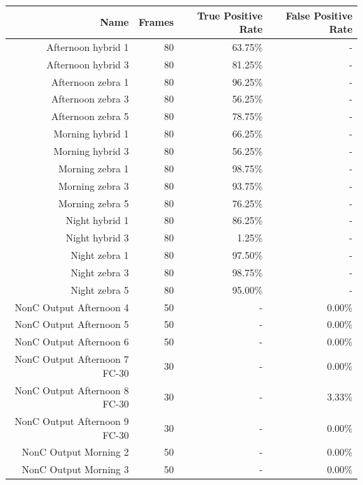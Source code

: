\documentclass[12pt]{ucthesis}
\begin{document}
    \begin{longtable}{|r|r|r|r|}
    \hline
    Name & Frames & True Positive Rate & False Positive Rate \bigstrut\\
    \hline
    Afternoon hybrid 1 & 80 & 63.75\% & - \bigstrut\\
    \hline
    Afternoon hybrid 3 & 80 & 81.25\% & - \bigstrut\\
    \hline
    Afternoon zebra 1 & 80 & 96.25\% & - \bigstrut\\
    \hline
    Afternoon zebra 3 & 80 & 56.25\% & - \bigstrut\\
    \hline
    Afternoon zebra 5 & 80 & 78.75\% & - \bigstrut\\
    \hline
    Morning hybrid 1 & 80 & 66.25\% & - \bigstrut\\
    \hline
    Morning hybrid 3 & 80 & 56.25\% & - \bigstrut\\
    \hline
    Morning zebra 1 & 80 & 98.75\% & - \bigstrut\\
    \hline
    Morning zebra 3 & 80 & 93.75\% & - \bigstrut\\
    \hline
    Morning zebra 5 & 80 & 76.25\% & - \bigstrut\\
    \hline
    Night hybrid 1 & 80 & 86.25\% & - \bigstrut\\
    \hline
    Night hybrid 3 & 80 & 1.25\% & - \bigstrut\\
    \hline
    Night zebra 1 & 80 & 97.50\% & - \bigstrut\\
    \hline
    Night zebra 3 & 80 & 98.75\% & - \bigstrut\\
    \hline
    Night zebra 5 & 80 & 95.00\% & - \bigstrut\\
    \hline
    NonC Output Afternoon 4 & 50 & -  & 0.00\% \bigstrut\\
    \hline
    NonC Output Afternoon 5 & 50 & -  & 0.00\% \bigstrut\\
    \hline
    NonC Output Afternoon 6 & 50 & -  & 0.00\% \bigstrut\\
    \hline
    NonC Output Afternoon 7 FC-30 & 30 & -  & 0.00\% \bigstrut\\
    \hline
    NonC Output Afternoon 8 FC-30 & 30 & -  & 3.33\% \bigstrut\\
    \hline
    NonC Output Afternoon 9 FC-30 & 30 & -  & 0.00\% \bigstrut\\
    \hline
    NonC Output Morning 2 & 50 & -  & 0.00\% \bigstrut\\
    \hline
    NonC Output Morning 3 & 50 & -  & 0.00\% \bigstrut\\

\end{longtable}
\end{document}

